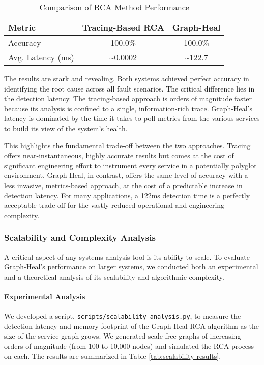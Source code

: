\documentclass[11pt,conference]{IEEEtran}
\begin{document}
\begin{table}[h!]
\centering
\caption{Comparison of RCA Method Performance}
\label{tab:baseline-comparison}
\begin{tabular}{|l|c|c|}
\hline
\textbf{Metric} & \textbf{Tracing-Based RCA} & \textbf{Graph-Heal} \\
\hline
Accuracy & 100.0\% & 100.0\% \\
\hline
Avg. Latency (ms) & \textasciitilde{}0.0002 & \textasciitilde{}122.7 \\
\hline
\end{tabular}
\end{table}

The results are stark and revealing. Both systems achieved perfect accuracy in identifying the root cause across all fault scenarios. The critical difference lies in the detection latency. The tracing-based approach is orders of magnitude faster because its analysis is confined to a single, information-rich trace. Graph-Heal's latency is dominated by the time it takes to poll metrics from the various services to build its view of the system's health.

This highlights the fundamental trade-off between the two approaches. Tracing offers near-instantaneous, highly accurate results but comes at the cost of significant engineering effort to instrument every service in a potentially polyglot environment. Graph-Heal, in contrast, offers the same level of accuracy with a less invasive, metrics-based approach, at the cost of a predictable increase in detection latency. For many applications, a 122ms detection time is a perfectly acceptable trade-off for the vastly reduced operational and engineering complexity.

\subsubsection{Scalability and Complexity Analysis}
A critical aspect of any systems analysis tool is its ability to scale. To evaluate Graph-Heal's performance on larger systems, we conducted both an experimental and a theoretical analysis of its scalability and algorithmic complexity.

\paragraph{Experimental Analysis}
We developed a script, \texttt{scripts/scalability\_analysis.py}, to measure the detection latency and memory footprint of the Graph-Heal RCA algorithm as the size of the service graph grows. We generated scale-free graphs of increasing orders of magnitude (from 100 to 10,000 nodes) and simulated the RCA process on each. The results are summarized in Table \ref{tab:scalability-results}.
\end{document}
